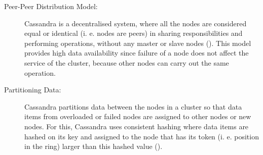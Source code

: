 \begin{description}

\item[Peer-Peer Distribution Model:] 
Cassandra is a decentralised system,  where all the nodes are considered equal
or identical (i. e.  nodes are peers) in sharing responsibilities and performing
operations,  without any  master or slave nodes (). 
This model provides high data availability since failure
of a node does not affect the service of the cluster,  because other
nodes can carry out the same operation. 


\item[Partitioning Data:] Cassandra partitions data between the nodes in a
cluster  so that data items from overloaded or failed nodes are
assigned to other nodes or new nodes.  For this,  Cassandra uses consistent
hashing where data items are hashed on its key and assigned  to the node that
has its  token (i. e.  position in the ring) larger than this hashed value
(). 


\end{description}
